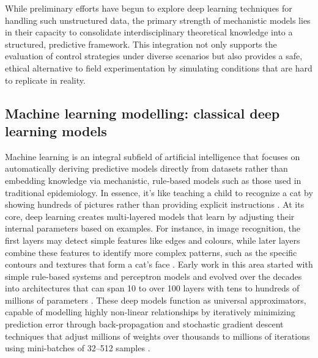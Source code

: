 While preliminary efforts have begun to explore deep learning techniques for handling such unstructured data, the primary strength of mechanistic models lies in their capacity to consolidate interdisciplinary theoretical knowledge into a structured, predictive framework. This integration not only supports the evaluation of control strategies under diverse scenarios but also provides a safe, ethical alternative to field experimentation by simulating conditions that are hard to replicate in reality.


\subsection{Machine learning modelling: classical deep learning models}

Machine learning is an integral subfield of artificial intelligence that focuses on automatically deriving predictive models directly from datasets rather than embedding knowledge via mechanistic, rule‐based models such as those used in traditional epidemiology. In essence, it’s like teaching a child to recognize a cat by showing hundreds of pictures rather than providing explicit instructions \cite{rosenblatt1958perceptron}. At its core, deep learning creates multi-layered models that learn by adjusting their internal parameters based on examples. For instance, in image recognition, the first layers may detect simple features like edges and colours, while later layers combine these features to identify more complex patterns, such as the specific contours and textures that form a cat’s face \cite{Goodfellow-et-al-2016}. Early work in this area started with simple rule-based systems and perceptron models \cite{rosenblatt1958perceptron} and evolved over the decades into architectures that can span 10 to over 100 layers with tens to hundreds of millions of parameters \cite{Goodfellow-et-al-2016}. These deep models function as universal approximators, capable of modelling highly non-linear relationships by iteratively minimizing prediction error through back-propagation \cite{rumelhart1986learning} and stochastic gradient descent techniques that adjust millions of weights over thousands to millions of iterations using mini-batches of 32–512 samples \cite{hinton2012deep}. 


